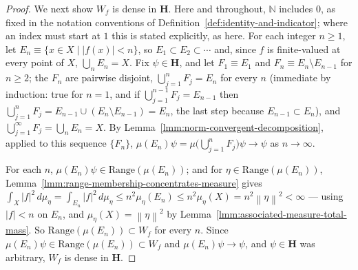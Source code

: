 \begin{proof}
We next show $W_f$ is dense in $\mathbf{H}$. Here and throughout, $\mathbb{N}$ includes $0$, as fixed in the notation conventions of Definition~\ref{def:identity-and-indicator}; where an index must start at $1$ this is stated explicitly, as here. For each integer $n \ge 1$, let $E_n \equiv \{ x \in X \mid \lvert f(x) \rvert < n \}$, so $E_1 \subset E_2 \subset \cdots$ and, since $f$ is finite-valued at every point of $X$, $\bigcup_{n} E_n = X$. Fix $\psi \in \mathbf{H}$, and let $F_1 \equiv E_1$ and $F_n \equiv E_n \setminus E_{n-1}$ for $n \ge 2$; the $F_n$ are pairwise disjoint, $\bigcup_{j=1}^n F_j = E_n$ for every $n$ (immediate by induction: true for $n=1$, and if $\bigcup_{j=1}^{n-1} F_j = E_{n-1}$ then $\bigcup_{j=1}^n F_j = E_{n-1} \cup (E_n \setminus E_{n-1}) = E_n$, the last step because $E_{n-1} \subset E_n$), and $\bigcup_{j=1}^\infty F_j = \bigcup_n E_n = X$. By Lemma~\ref{lmm:norm-convergent-decomposition}, applied to this sequence $\{F_n\}$, $\mu(E_n)\psi = \mu\big(\bigcup_{j=1}^n F_j\big)\psi \to \psi$ as $n \to \infty$.

For each $n$, $\mu(E_n)\psi \in \text{Range}(\mu(E_n))$; and for $\eta \in \text{Range}(\mu(E_n))$, Lemma~\ref{lmm:range-membership-concentrates-measure} gives $\int_X \lvert f \rvert^2\,d\mu_\eta = \int_{E_n} \lvert f \rvert^2\,d\mu_\eta \le n^2 \mu_\eta(E_n) \le n^2 \mu_\eta(X) = n^2 \left\| \eta \right\|^2 < \infty$ — using $\lvert f \rvert < n$ on $E_n$, and $\mu_\eta(X) = \left\| \eta \right\|^2$ by Lemma~\ref{lmm:associated-measure-total-mass}. So $\text{Range}(\mu(E_n)) \subset W_f$ for every $n$. Since $\mu(E_n)\psi \in \text{Range}(\mu(E_n)) \subset W_f$ and $\mu(E_n)\psi \to \psi$, and $\psi \in \mathbf{H}$ was arbitrary, $W_f$ is dense in $\mathbf{H}$.


\end{proof}
